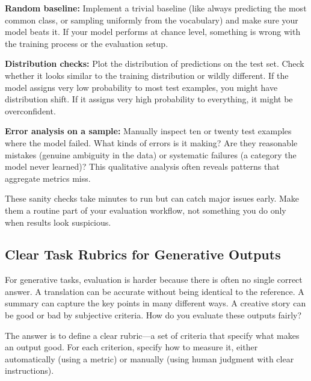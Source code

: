 \vspace{0.3cm}

\textbf{Random baseline:} Implement a trivial baseline (like always predicting the most common class, or sampling uniformly from the vocabulary) and make sure your model beats it. If your model performs at chance level, something is wrong with the training process or the evaluation setup.

\vspace{0.3cm}

\textbf{Distribution checks:} Plot the distribution of predictions on the test set. Check whether it looks similar to the training distribution or wildly different. If the model assigns very low probability to most test examples, you might have distribution shift. If it assigns very high probability to everything, it might be overconfident.

\vspace{0.3cm}

\textbf{Error analysis on a sample:} Manually inspect ten or twenty test examples where the model failed. What kinds of errors is it making? Are they reasonable mistakes (genuine ambiguity in the data) or systematic failures (a category the model never learned)? This qualitative analysis often reveals patterns that aggregate metrics miss.

\vspace{0.3cm}

These sanity checks take minutes to run but can catch major issues early. Make them a routine part of your evaluation workflow, not something you do only when results look suspicious.

\vspace{1em}

\subsection{Clear Task Rubrics for Generative Outputs}

For generative tasks, evaluation is harder because there is often no single correct answer. A translation can be accurate without being identical to the reference. A summary can capture the key points in many different ways. A creative story can be good or bad by subjective criteria. How do you evaluate these outputs fairly?

\vspace{0.3cm}

The answer is to define a clear rubric---a set of criteria that specify what makes an output good. For each criterion, specify how to measure it, either automatically (using a metric) or manually (using human judgment with clear instructions).

